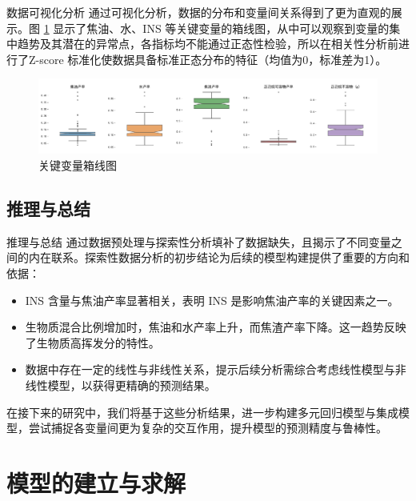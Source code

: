 \documentclass{beamer}
\begin{document}
\begin{frame}{数据可视化分析}
    \justifying
    通过可视化分析，数据的分布和变量间关系得到了更为直观的展示。图 \ref{fig:boxplot} 显示了焦油、水、INS 等关键变量的箱线图，从中可以观察到变量的集中趋势及其潜在的异常点，各指标均不能通过正态性检验，所以在相关性分析前进行了Z-score 标准化使数据具备标准正态分布的特征（均值为0，标准差为1）。

    \vspace{1cm}

    \begin{figure}[htbp]
        \centering
        \includegraphics[width=0.99\linewidth]{pic/boxplot.pdf}
        \caption{关键变量箱线图}
        \label{fig:boxplot}
    \end{figure}
\end{frame}


\subsection{推理与总结}
\begin{frame}{推理与总结}
    \justifying
    通过数据预处理与探索性分析填补了数据缺失，且揭示了不同变量之间的内在联系。探索性数据分析的初步结论为后续的模型构建提供了重要的方向和依据：

    \begin{itemize}
        \item INS 含量与焦油产率显著相关，表明 INS 是影响焦油产率的关键因素之一。
        \item 生物质混合比例增加时，焦油和水产率上升，而焦渣产率下降。这一趋势反映了生物质高挥发分的特性。
        \item 数据中存在一定的线性与非线性关系，提示后续分析需综合考虑线性模型与非线性模型，以获得更精确的预测结果。
    \end{itemize}
    
    在接下来的研究中，我们将基于这些分析结果，进一步构建多元回归模型与集成模型，尝试捕捉各变量间更为复杂的交互作用，提升模型的预测精度与鲁棒性。
\end{frame}


\section{模型的建立与求解}
\end{document}

